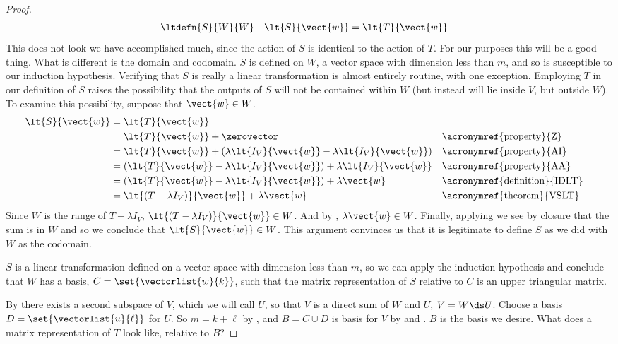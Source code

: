 \begin{proof}
%
\begin{align*}
&\ltdefn{S}{W}{W}
&
\lt{S}{\vect{w}}&=\lt{T}{\vect{w}}
\end{align*}
%
This does not look we have accomplished much, since the action of $S$ is identical to the action of $T$.  For our purposes this will be a good thing.  What is different is the domain and codomain.  $S$ is defined on $W$, a vector space with dimension less than $m$, and so is susceptible to our induction hypothesis.  Verifying that $S$ is really a linear transformation is almost entirely routine, with one exception.  Employing $T$ in our definition of $S$ raises the possibility that the outputs of $S$ will not be contained within $W$ (but instead will lie inside $V$, but outside $W$).  To examine this possibility, suppose that $\vect{w}\in W$. 
%
\begin{align*}
\lt{S}{\vect{w}}
&=\lt{T}{\vect{w}}\\
&=\lt{T}{\vect{w}}+\zerovector&&\text{\acronymref{property}{Z}}\\
%
&=\lt{T}{\vect{w}}+\left(\lambda\lt{I_V}{\vect{w}}-\lambda\lt{I_V}{\vect{w}}\right)&&\text{\acronymref{property}{AI}}\\
%
&=\left(\lt{T}{\vect{w}}-\lambda\lt{I_V}{\vect{w}}\right)+\lambda\lt{I_V}{\vect{w}}&&\text{\acronymref{property}{AA}}\\
%
&=\left(\lt{T}{\vect{w}}-\lambda\lt{I_V}{\vect{w}}\right)+\lambda\vect{w}&&\text{\acronymref{definition}{IDLT}}\\
%
&=\lt{\left(T-\lambda I_V\right)}{\vect{w}}+\lambda\vect{w}
&&\text{\acronymref{theorem}{VSLT}}
%
\end{align*}
%
Since $W$ is the range of $T-\lambda I_V$, $\lt{\left(T-\lambda I_V\right)}{\vect{w}}\in W$.  And by , $\lambda\vect{w}\in W$.  Finally, applying  we see by closure that the sum is in $W$ and so we conclude that $\lt{S}{\vect{w}}\in W$.  This argument convinces us that it is legitimate to define $S$ as we did with $W$ as the codomain.\par
%
$S$ is a linear transformation defined on a vector space with dimension less than $m$, so we can apply the induction hypothesis and conclude that $W$ has a basis, $C=\set{\vectorlist{w}{k}}$, such that the matrix representation of $S$ relative to $C$ is an upper triangular matrix.\par
%
By  there exists a second subspace of $V$, which we will call $U$, so that $V$ is a direct sum of $W$ and $U$, $V=W\ds U$.  Choose a basis $D=\set{\vectorlist{u}{\ell}}$ for $U$.  So  $m=k+\ell$ by , and $B=C\cup D$ is basis for $V$ by  and .  $B$ is the basis we desire.  What does a matrix representation of $T$ look like, relative to $B$?\par

\end{proof}
